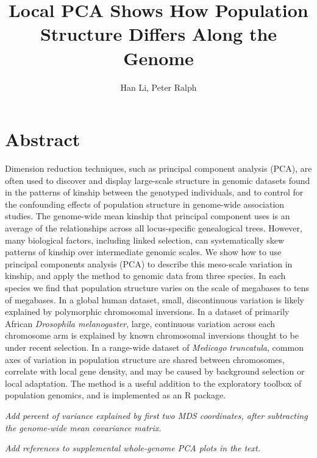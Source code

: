 \documentclass[11pt, oneside]{article}   	%
\title{Local PCA Shows How Population Structure Differs Along the Genome}
\author{Han Li, Peter Ralph}
\newcommand{\plr}[1]{{\em \color{blue} #1}}
\begin{document}
\maketitle
\doublespacing


\section*{Abstract}

Dimension reduction techniques,
such as principal component analysis (PCA),
are often used to discover and display large-scale structure in genomic datasets
found in the patterns of kinship
between the genotyped individuals,
and to control for the confounding effects of population structure in genome-wide association studies.
The genome-wide mean kinship that principal component uses
is an average of the relationships across all locus-specific genealogical trees.
However, many biological factors,
including linked selection,
can systematically skew patterns of kinship over intermediate genomic scales.
We show how to use principal components analysis (PCA) to describe this meso-scale variation in kinship,
and apply the method to genomic data from three species.
In each species we find that population structure varies on the scale of megabases to tens of megabases.
In a global human dataset, small, discontinuous variation is likely explained by polymorphic chromosomal inversions.
In a dataset of primarily African \textit{Drosophila melanogaster}, large, continuous variation across each chromosome arm
is explained by known chromosomal inversions thought to be under recent selection.
In a range-wide dataset of \textit{Medicago truncatula},
common axes of variation in population structure are shared between chromosomes,
correlate with local gene density,
and may be caused by background selection or local adaptation.
The method is a useful addition to the exploratory toolbox
of population genomics,
and is implemented as an R package.

\plr{Add percent of variance explained by first two MDS coordinates, after subtracting the genome-wide mean covariance matrix.}

\plr{Add references to supplemental whole-genome PCA plots in the text.}
\end{document}
